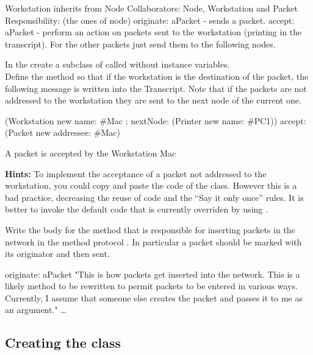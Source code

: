 \begin{code}
Workstation inherits from Node
Collaborators: Node, Workstation
and Packet
Responsibility: (the ones of node)
originate: aPacket - sends a packet.
accept: aPacket - perform an action on packets sent to the
workstation (printing in the transcript). For the other
packets just send them to the following nodes.
\end{code}

\exercise In the \category {} create a subclass of
called  without instance
variables. \\

\exercise  Define the method  so that if
the workstation is the destination of the packet, the following
message is written into the Transcript. Note that if the packets
are not addressed to the workstation they are sent to the next
node of the current one.

\begin{code}
(Workstation new
    name: \#Mac ;
    nextNode: (Printer new name: \#PC1))
          accept: (Packet new addressee: \#Mac)

A packet is accepted by the Workstation Mac
\end{code}

\textbf{Hints:} To implement the acceptance of a packet not addressed
to the workstation, you could copy and paste the code of the
 class. However this is a bad practice, decreasing
the reuse of code and the ``Say it only once'' rules. It is better
to invoke the default code that is currently overriden by using
.

\exercise  Write the body for the method  that
is responsible for inserting packets in the network in the method
protocol . In particular a packet should be
marked with its originator and then sent.

\begin{code}
originate: aPacket
 "This is how packets get inserted into the network.
  This is a likely method to be rewritten to permit
  packets to be entered in various ways. Currently,
  I assume that someone else creates the packet and
  passes it to me as an argument."
 \ldots

\end{code}

\subsection*{Creating the class }

